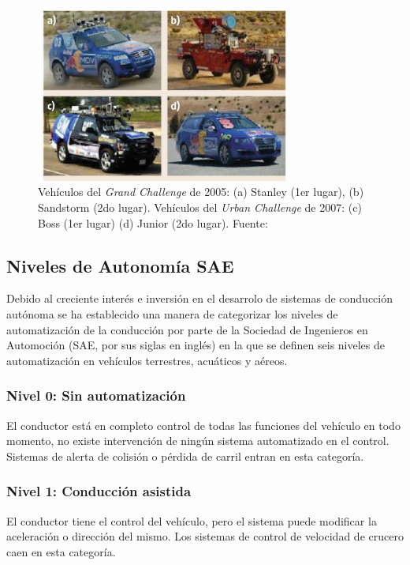 \begin{figure}[!h] 
    \centering
    \includegraphics[width=0.75\textwidth]{img/darpa}
    \caption{Vehículos del \textit{Grand Challenge} de 2005: (a) Stanley (1er lugar), (b) Sandstorm (2do lugar). Vehículos del \textit{Urban Challenge} de 2007: (c) Boss (1er lugar) (d) Junior (2do lugar). Fuente: \cite{wikipedia_2018} }
    \label{fig:darpa}
\end{figure}



    \subsection{Niveles de Autonomía SAE}
    Debido al creciente interés e inversión en el desarrolo de sistemas de conducción autónoma se ha establecido 
    una manera de categorizar los niveles de automatización de la conducción por parte de  la Sociedad de Ingenieros en Automoción
    (SAE, por sus siglas en inglés) en la que se definen seis niveles de automatización en vehículos terrestres, acuáticos y aéreos.

        \subsubsection{Nivel 0: Sin automatización}
        El conductor está en completo control de todas las funciones del vehículo en todo momento, no existe intervención 
        de ningún sistema automatizado en el control. Sistemas de alerta de colisión o pérdida de carril entran en esta categoría.
        
        \subsubsection{Nivel 1: Conducción asistida}
        El conductor tiene el control del vehículo, pero el sistema puede modificar la aceleración o dirección del mismo. Los 
        sistemas de control de velocidad de crucero caen en esta categoría.
        
